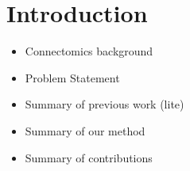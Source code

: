 \section{Introduction}

\begin{itemize}
	\item Connectomics background
	\item Problem Statement
	\item Summary of previous work (lite)
	\item Summary of our method
	\item Summary of contributions
\end{itemize}
